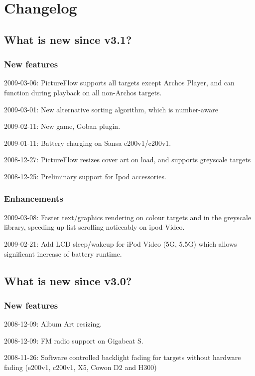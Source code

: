 \chapter{\label{ref:changelog}Changelog}
\section{What is new since v3.1?}

\subsection{New features}
\begin{changelog}
\item 2009-03-06: PictureFlow supports all targets except Archos Player, and can function during playback on all non-Archos targets.
\item 2009-03-01: New alternative sorting algorithm, which is number-aware
\item 2009-02-11: New game, Goban plugin.
\item 2009-01-11: Battery charging on Sansa e200v1/c200v1.
\item 2008-12-27: PictureFlow resizes cover art on load, and supports greyscale targets
\item 2008-12-25: Preliminary support for Ipod accessories.
\end{changelog}
\subsection{Enhancements}
\begin{changelog}
\item 2009-03-08: Faster text/graphics rendering on colour targets and in the greyscale library, speeding up list scrolling noticeably on ipod Video.
\item 2009-02-21: Add LCD sleep/wakeup for iPod Video (5G, 5.5G) which allows significant increase of battery runtime.
\end{changelog}

\section{What is new since v3.0?}

\subsection{New features}
\begin{changelog}
\item 2008-12-09: Album Art resizing.
\item 2008-12-09: FM radio support on Gigabeat S.
\item 2008-11-26: Software controlled backlight fading for targets without hardware fading (e200v1, c200v1, X5, Cowon D2 and H300)
\end{changelog}

